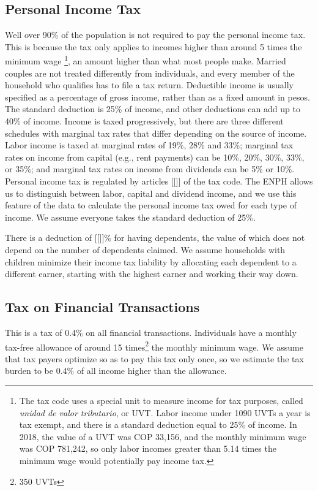 \documentclass[12pt]{article}
\begin{document}
\begin{appendices}
\begin{itemize}
\end{itemize}

\subsection{Personal Income Tax}
Well over 90\% of the population is not required to pay the personal income tax.
This is because the tax only applies to incomes
higher than around 5 times the minimum wage
\footnote{
The tax code uses a special unit to measure income for tax purposes,
called \textit{unidad de valor tributario}, or UVT.
Labor income under 1090 UVTs a year is tax exempt,
and there is a standard deduction equal to 25\% of income.
In 2018, the value of a UVT was COP 33,156,
and the monthly minimum wage was COP 781,242,
so only labor incomes greater than 5.14 times the minimum wage
would potentially pay income tax.},
an amount higher than what most people make.
Married couples are not treated differently from individuals,
and every member of the household who qualifies has to file a tax return.
Deductible income is usually specified as a percentage of gross income,
rather than as a fixed amount in pesos.
The standard deduction is 25\% of income,
and other deductions can add up to 40\% of income.
Income is taxed progressively,
but there are three different schedules
with marginal tax rates that differ depending on the source of income.
Labor income is taxed at marginal rates of 19\%, 28\% and 33\%;
marginal tax rates on income from capital
(e.g., rent payments)
can be 10\%, 20\%, 30\%, 33\%, or 35\%;
and marginal tax rates on income from dividends can be 5\% or 10\%.
Personal income tax is regulated by articles [[]] of the tax code.
The ENPH allows us to distinguish between
labor, capital and dividend income,
and we use this feature of the data to calculate
the personal income tax owed for each type of income.
We assume everyone takes the standard deduction of 25\%.

There is a deduction of [[]]\% for having dependents,
the value of which does not depend on the number of dependents claimed.
We assume households with children minimize their income tax liability
by allocating each dependent to a different earner,
starting with the highest earner and working their way down.

\subsection{Tax on Financial Transactions}

This is a tax of 0.4\% on all financial transactions.
Individuals have a monthly tax-free allowance of around
15 times\footnote{350 UVTs} the monthly minimum wage.
We assume that tax payers optimize so as to pay this tax only once,
so we estimate the tax burden to be
0.4\% of all income higher than the allowance.


\end{appendices}
\end{document}
